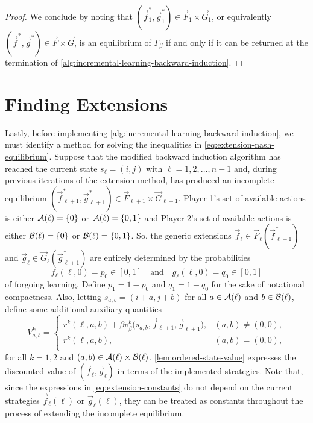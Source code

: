 \begin{proof}
        We conclude by noting that $(\vec{f}^*_1, \vec{g}^*_1) \in \vec{F}_1 \times \vec{G}_1$, or equivalently $(\vec{f}^*, \vec{g}^*) \in \vec{F} \times \vec{G}$, is an equilibrium of $\Gamma_\beta$ if and only if it can be returned at the termination of \autoref{alg:incremental-learning-backward-induction}.
    \end{proof}


\section{Finding Extensions} \label{sec:finding-extensions}
    Lastly, before implementing \autoref{alg:incremental-learning-backward-induction}, we must identify a method for solving the inequalities in \eqref{eq:extension-nash-equilibrium}.
    Suppose that the modified backward induction algorithm has reached the current state $s_\ell = (i, j)$ with $\ell = 1, 2, \ldots, n - 1$ and, during previous iterations of the extension method, has produced an incomplete equilibrium $(\vec{f}^*_{\ell + 1}, \vec{g}^*_{\ell + 1}) \in \vec{F}_{\ell + 1} \times \vec{G}_{\ell + 1}$.
    Player 1's set of available actions is either $\mathcal{A}(\ell) = \{0\}$ or $\mathcal{A}(\ell) = \{0, 1\}$ and Player 2's set of available actions is either $\mathcal{B}(\ell) = \{0\}$ or $\mathcal{B}(\ell) = \{0, 1\}$.
    So, the generic extensions $\vec{f}_\ell \in \vec{F}_{\ell}(\vec{f}^*_{\ell + 1})$ and $\vec{g}_\ell \in \vec{G}_{\ell}(\vec{g}^*_{\ell + 1})$ are entirely determined by the probabilities
    \[
        f_\ell(\ell, 0) 
            = p_0
            \in [0, 1]
        \quad\text{and}\quad
        g_\ell(\ell, 0) 
            = q_0
            \in [0, 1]
    \]
    of forgoing learning.
    Define $p_1 = 1 - p_0$ and $q_1 = 1 - q_0$ for the sake of notational compactness.
    Also, letting $s_{a, b} = (i + a, j + b)$ for all $a \in \mathcal{A}(\ell)$ and $b \in \mathcal{B}(\ell)$, define some additional auxiliary quantities
    \begin{equation}  \label{eq:extension-constants}
        V^k_{a, b}
            =
            \begin{cases}
                r^k(\ell, a, b) + \beta v^k_\beta\big(s_{a, b}, \vec{f}_{\ell + 1}, \vec{g}_{\ell + 1}\big), & (a, b) \neq (0, 0), \\
                r^k(\ell, a, b), & (a, b) = (0, 0), \\
            \end{cases}
    \end{equation}
    for all $k = 1, 2$ and $(a, b) \in \mathcal{A}(\ell) \times \mathcal{B}(\ell)$.
    \autoref{lem:ordered-state-value} expresses the discounted value of $(\vec{f}_\ell, \vec{g}_\ell)$ in terms of the implemented strategies.
    Note that, since the expressions in \eqref{eq:extension-constants} do not depend on the current strategies $\vec{f}_\ell(\ell)$ or $\vec{g}_\ell(\ell)$, they can be treated as constants throughout the process of extending the incomplete equilibrium.

